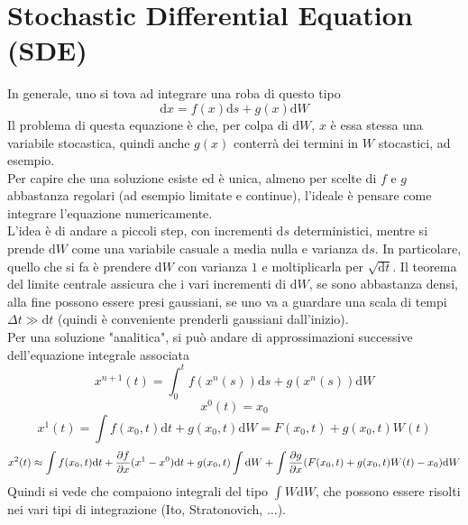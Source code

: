 \documentclass[a4paper,12pt]{article}
\theoremstyle{plain}
\theoremstyle{definition}
\renewcommand{\d}{\text{d}}
\theoremstyle{remark}
\begin{document}
\section{Stochastic Differential Equation (SDE)}
In generale, uno si tova ad integrare una roba di questo tipo
\[\d x= f(x)\d s+g(x) \d W		\]
Il problema di questa equazione è che, per colpa di $\d W$, $x$ è essa stessa una variabile stocastica, quindi anche $g(x)$ conterrà dei termini in $W$ stocastici, ad esempio.
\\ Per capire che una soluzione esiste ed è unica, almeno per scelte di $f$ e $g$ abbastanza regolari (ad esempio limitate e continue), l'ideale è pensare come integrare l'equazione numericamente.
\\L'idea è di andare a piccoli step, con incrementi $\d s$ deterministici, mentre si prende $\d W$ come una variabile casuale a media nulla e varianza $\d s$. In particolare, quello che si fa è  prendere $\d W$ con varianza $1$ e moltiplicarla per $\sqrt{\d t}$.
Il teorema del limite centrale assicura che i vari incrementi di $\d W$, se sono abbastanza densi, alla fine possono essere presi gaussiani, se uno va a guardare una scala di tempi $\Delta t\gg \d t$ (quindi è conveniente prenderli gaussiani dall'inizio).
\\Per una soluzione "analitica", si può andare di approssimazioni successive dell'equazione integrale associata
\[x^{n+1}(t)=\int_0^t	f(x^n(s))	\d s+g(x^n(s))\d W		\]
\[x^0(t)=x_0\]
\[x^1(t)=\int f(x_0,t)\d t+g(x_0,t) \d W=F(x_0,t)+g(x_0,t) W(t)		\]
\[x^2(t)\approx		\int f(x_0,t)\d t+{\pdv{f}{x}}	(x^1-x^0)\d t+g(x_0,t) \int \d W+\int {\pdv{g}{x}}(F(x_0,t)+g(x_0,t) W(t)-x_0	) \d W			\]
Quindi si vede che compaiono integrali del tipo $\int W \d W$, che possono essere risolti nei vari tipi di integrazione (Ito, Stratonovich, $\ldots$).	
\end{document}
